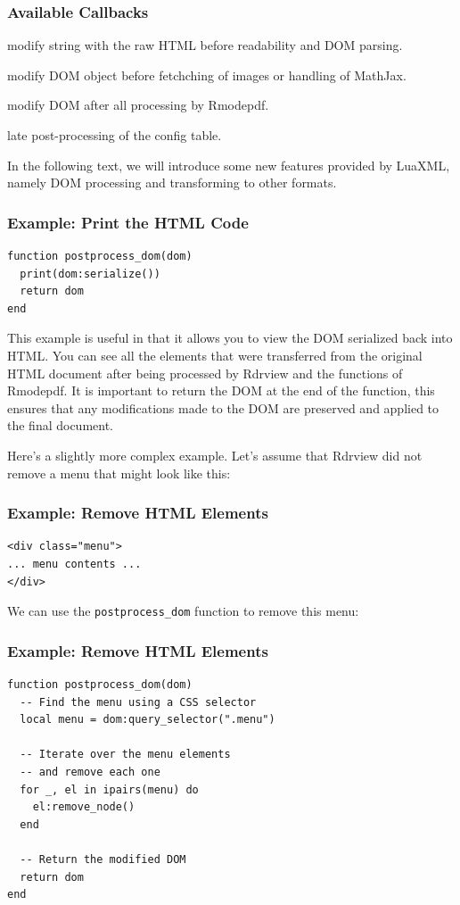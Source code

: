 \begin{frame}[fragile]
  \frametitle{Available Callbacks}
  \begin{description}
  \item[\texttt{preprocess\_content}] modify string with the raw HTML before
    readability and DOM parsing.
  \item[\texttt{preprocess\_dom}] modify DOM object before fetchching of images
    or handling of MathJax.
  \item[\texttt{postprocess\_dom}] modify DOM after all processing by Rmodepdf.
  \item[\texttt{postprocess}] late post-processing of the config table.
\end{description}

\end{frame}

In the following text, we will introduce some new features provided by LuaXML, 
namely DOM processing and transforming to other formats.

\begin{frame}[fragile]
  \frametitle{Example: Print the HTML Code}


\begin{verbatim}
function postprocess_dom(dom)
  print(dom:serialize())
  return dom
end
\end{verbatim}
\end{frame}

This example is useful in that it allows you to view the DOM serialized back
into HTML. You can see all the elements that were transferred from the original
HTML document after being processed by Rdrview and the functions of Rmodepdf.
It is important to return the DOM at the end of the function, this ensures that
any modifications made to the DOM are preserved and applied to the final
document.

Here's a slightly more complex example. Let's assume that Rdrview did
not remove a menu that might look like this:

\begin{frame}[fragile]
  \frametitle{Example: Remove HTML Elements}
\begin{verbatim}
<div class="menu">
... menu contents ...
</div>
\end{verbatim}
\end{frame}


We can use the \texttt{postprocess\_dom} function to remove this menu:

\begin{frame}[fragile]
  \frametitle{Example: Remove HTML Elements}
\begin{verbatim}
function postprocess_dom(dom)
  -- Find the menu using a CSS selector
  local menu = dom:query_selector(".menu")

  -- Iterate over the menu elements 
  -- and remove each one
  for _, el in ipairs(menu) do
    el:remove_node()
  end
  
  -- Return the modified DOM
  return dom
end
\end{verbatim}
\end{frame}

